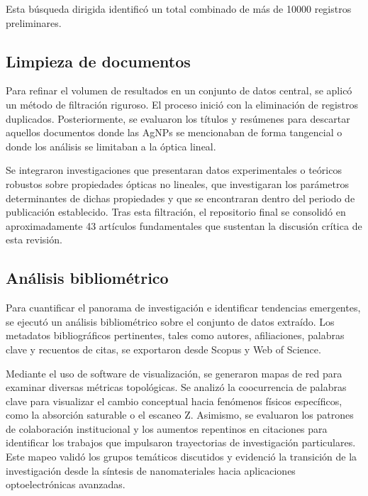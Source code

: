 Esta búsqueda dirigida identificó un total combinado de más de \num{10000}
registros preliminares.

\subsection{Limpieza de documentos}
Para refinar el volumen de resultados en un conjunto de datos central, se
aplicó un método de filtración riguroso. El proceso inició con la eliminación
de registros duplicados. Posteriormente, se evaluaron los títulos y resúmenes
para descartar aquellos documentos donde las AgNPs se mencionaban de forma
tangencial o donde los análisis se limitaban a la óptica lineal.

Se integraron investigaciones que presentaran datos experimentales o teóricos
robustos sobre propiedades ópticas no lineales, que investigaran los parámetros
determinantes de dichas propiedades y que se encontraran dentro del periodo de
publicación establecido. Tras esta filtración, el repositorio final se consolidó
en aproximadamente 43 artículos fundamentales que sustentan la discusión crítica
de esta revisión.

\subsection{Análisis bibliométrico}
Para cuantificar el panorama de investigación e identificar tendencias
emergentes, se ejecutó un análisis bibliométrico sobre el conjunto de datos
extraído. Los metadatos bibliográficos pertinentes, tales como autores,
afiliaciones, palabras clave y recuentos de citas, se exportaron desde Scopus
y Web of Science.

Mediante el uso de software de visualización, se generaron mapas de red para
examinar diversas métricas topológicas. Se analizó la coocurrencia de palabras
clave para visualizar el cambio conceptual hacia fenómenos físicos específicos,
como la absorción saturable o el escaneo Z. Asimismo, se evaluaron los patrones
de colaboración institucional y los aumentos repentinos en citaciones para
identificar los trabajos que impulsaron trayectorias de investigación
particulares. Este mapeo validó los grupos temáticos discutidos y evidenció la
transición de la investigación desde la síntesis de nanomateriales hacia
aplicaciones optoelectrónicas avanzadas.
